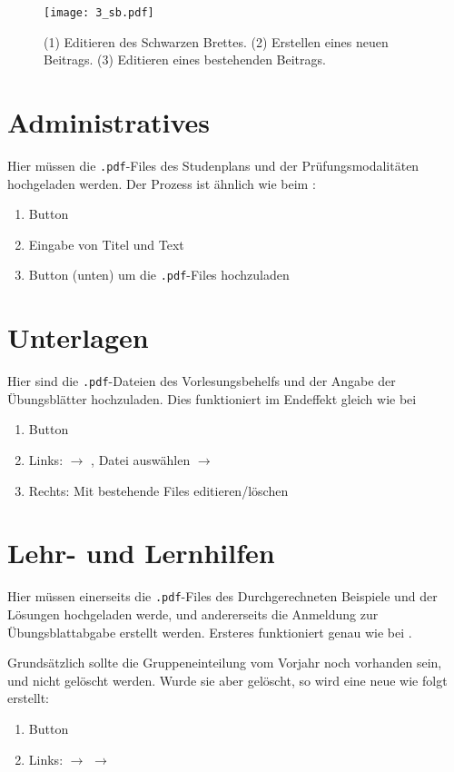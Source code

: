 \begin{figure}[htbp]
  \texttt{[image: 3\_sb.pdf]}
  \caption{ (1) Editieren des Schwarzen Brettes. (2) Erstellen eines neuen
    Beitrags. (3) Editieren eines bestehenden Beitrags.}
  \label{fig:sb}
\end{figure}

\section{Administratives}

Hier müssen die {\tt .pdf}-Files des Studenplans und der Prüfungsmodalitäten
hochgeladen werden. Der Prozess ist ähnlich wie beim :
\begin{enumerate}
\item Button 
\item Eingabe von Titel und Text
\item Button  (unten) um die {\tt .pdf}-Files hochzuladen
\end{enumerate}


\section{Unterlagen}

Hier sind die {\tt .pdf}-Dateien des Vorlesungsbehelfs und der Angabe der
Übungsblätter hochzuladen. Dies funktioniert im Endeffekt gleich wie bei
\begin{enumerate}
\item Button 
\item Links:  $\to$ , Datei auswählen
  $\to$ 
\item Rechts: Mit  bestehende Files editieren/löschen
\end{enumerate}


\section{Lehr- und Lernhilfen}

Hier müssen einerseits die {\tt .pdf}-Files des Durchgerechneten Beispiele und
der Lösungen hochgeladen werde, und andererseits die Anmeldung zur 
Übungsblattabgabe erstellt werden. Ersteres funktioniert genau wie bei
.

Grundsätzlich sollte die Gruppeneinteilung vom Vorjahr noch vorhanden sein, und
nicht gelöscht werden. Wurde sie aber gelöscht, so wird eine neue wie folgt
erstellt:
\begin{enumerate}
\item Button 
\item Links:  $\to$ 
  $\to$ 
\end{enumerate}

